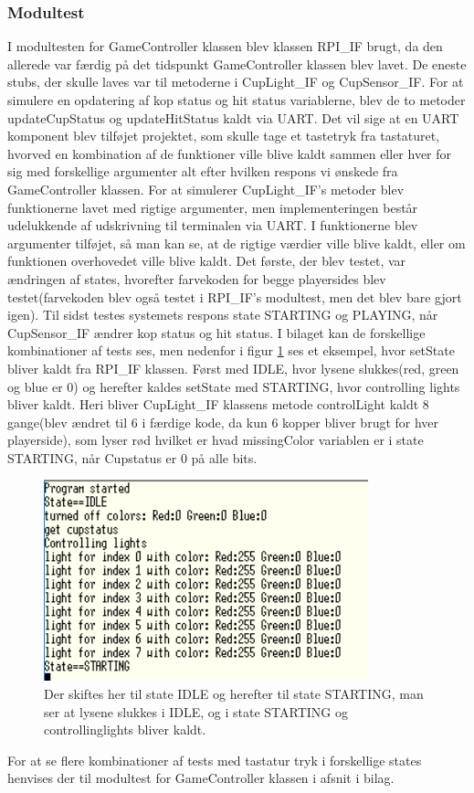 \documentclass[Rapport/Playerside/GameController/GameController.tex]{subfiles}
\begin{document}
\subsubsection{Modultest}
I modultesten for GameController klassen blev klassen RPI\_IF brugt, da den allerede var færdig på det tidspunkt GameController klassen blev lavet. De eneste stubs, der skulle laves var til metoderne i CupLight\_IF og CupSensor\_IF. For at simulere en opdatering af kop status og hit status variablerne, blev de to metoder updateCupStatus og updateHitStatus kaldt via UART. Det vil sige at en UART komponent blev tilføjet projektet, som skulle tage et tastetryk fra tastaturet, hvorved en kombination af de funktioner ville blive kaldt sammen eller hver for sig med forskellige argumenter alt efter hvilken respons vi ønskede fra GameController klassen. For at simulerer CupLight\_IF's metoder blev funktionerne lavet med rigtige argumenter, men implementeringen består udelukkende af udskrivning til terminalen via UART. I funktionerne blev argumenter tilføjet, så man kan se, at de rigtige værdier ville blive kaldt, eller om funktionen overhovedet ville blive kaldt. Det første, der blev testet, var ændringen af states, hvorefter farvekoden for begge playersides blev testet(farvekoden blev også testet i RPI\_IF's modultest, men det blev bare gjort igen). Til sidst testes systemets respons state STARTING og PLAYING, når CupSensor\_IF ændrer kop status og hit status. I bilaget kan de forskellige kombinationer af tests ses, men nedenfor i figur \ref{fig:IDLE_STARTING} ses et eksempel, hvor setState bliver kaldt fra RPI\_IF klassen. Først med IDLE, hvor lysene slukkes(red, green og blue er 0) og herefter kaldes setState med STARTING, hvor controlling lights bliver kaldt. Heri bliver CupLight\_IF klassens metode controlLight kaldt 8 gange(blev ændret til 6 i færdige kode, da kun 6 kopper bliver brugt for hver playerside), som lyser rød hvilket er hvad missingColor variablen er i state STARTING, når Cupstatus er 0 på alle bits.
\begin{figure}
    \centering 
    \includegraphics[width=0.5\linewidth]{Rapport/Playerside/graphics/GameController/IDLE_STARTING.PNG}
    \caption{Der skiftes her til state IDLE og herefter til state STARTING, man ser at lysene slukkes i IDLE, og i state STARTING og controllinglights bliver kaldt.}
    \label{fig:IDLE_STARTING}
\end{figure}
For at se flere kombinationer af tests med tastatur tryk i forskellige states henvises der til modultest for GameController klassen i afsnit  i bilag.
\end{document}
